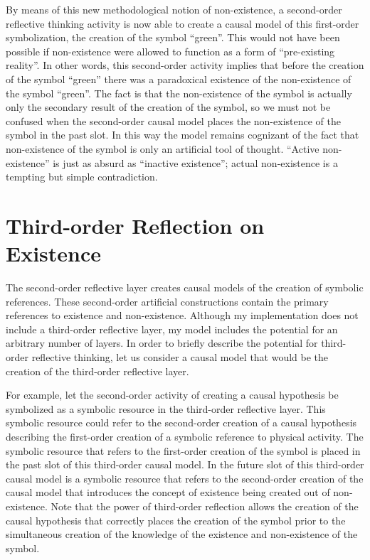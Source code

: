 By means of this new methodological notion of non-existence, a
second-order reflective thinking activity is now able to create a
causal model of this first-order symbolization, the creation of the
symbol ``green''.  This would not have been possible if non-existence
were allowed to function as a form of ``pre-existing reality''.  In
other words, this second-order activity implies that before the
creation of the symbol ``green'' there was a paradoxical existence of
the non-existence of the symbol ``green''.  The fact is that the
non-existence of the symbol is actually only the secondary result of
the creation of the symbol, so we must not be confused when the
second-order causal model places the non-existence of the symbol in
the past slot.  In this way the model remains cognizant of the fact
that non-existence of the symbol is only an artificial tool of
thought.  ``Active non-existence'' is just as absurd as ``inactive
existence''; actual non-existence is a tempting but simple
contradiction.

\section{Third-order Reflection on Existence}

The second-order reflective layer creates causal models of the
creation of symbolic references.  These second-order artificial
constructions contain the primary references to existence and
non-existence.  Although my implementation does not include a
third-order reflective layer, my model includes the potential for an
arbitrary number of layers.  In order to briefly describe the
potential for third-order reflective thinking, let us consider a
causal model that would be the creation of the third-order reflective
layer.

For example, let the second-order activity of creating a causal
hypothesis be symbolized as a symbolic resource in the third-order
reflective layer.  This symbolic resource could refer to the
second-order creation of a causal hypothesis describing the
first-order creation of a symbolic reference to physical activity.
The symbolic resource that refers to the first-order creation of the
symbol is placed in the past slot of this third-order causal model.
In the future slot of this third-order causal model is a symbolic
resource that refers to the second-order creation of the causal model
that introduces the concept of existence being created out of
non-existence.  Note that the power of third-order reflection allows
the creation of the causal hypothesis that correctly places the
creation of the symbol prior to the simultaneous creation of the
knowledge of the existence and non-existence of the symbol.

